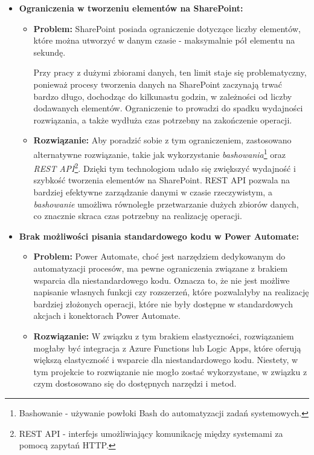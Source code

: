 \begin{itemize}
    \item \textbf{Ograniczenia w tworzeniu elementów na SharePoint:}
          \begin{itemize}
              \item \textbf{Problem:} SharePoint posiada ograniczenie dotyczące liczby elementów, które można utworzyć w danym czasie - maksymalnie pół elementu na sekundę.


                    Przy pracy z dużymi zbiorami danych, ten limit staje się problematyczny, ponieważ procesy tworzenia danych na SharePoint zaczynają trwać bardzo długo, dochodząc do kilkunastu godzin, w zależności od liczby dodawanych elementów. Ograniczenie to prowadzi do spadku wydajności rozwiązania, a także wydłuża czas potrzebny na zakończenie operacji.

              \item \textbf{Rozwiązanie:} Aby poradzić sobie z tym ograniczeniem, zastosowano alternatywne rozwiązanie, takie jak wykorzystanie \emph{bashowania}\footnote{Bashowanie - używanie powłoki Bash do automatyzacji zadań systemowych.} oraz \emph{REST API}\footnote{REST API - interfejs umożliwiający komunikację między systemami za pomocą zapytań HTTP.}. Dzięki tym technologiom udało się zwiększyć wydajność i szybkość tworzenia elementów na SharePoint. REST API pozwala na bardziej efektywne zarządzanie danymi w czasie rzeczywistym, a \emph{bashowanie} umożliwa równoległe przetwarzanie dużych zbiorów danych, co znacznie skraca czas potrzebny na realizację operacji.

          \end{itemize}

    \item \textbf{Brak możliwości pisania standardowego kodu w Power Automate:}
          \begin{itemize}
              \item \textbf{Problem:} Power Automate, choć jest narzędziem dedykowanym do automatyzacji procesów, ma pewne ograniczenia związane z brakiem wsparcia dla niestandardowego kodu. Oznacza to, że nie jest możliwe napisanie własnych funkcji czy rozszerzeń, które pozwalałyby na realizację bardziej złożonych operacji, które nie były dostępne w standardowych akcjach i konektorach Power Automate.
              \item \textbf{Rozwiązanie:} W związku z tym brakiem elastyczności, rozwiązaniem mogłaby być integracja z Azure Functions lub Logic Apps, które oferują większą elastyczność i wsparcie dla niestandardowego kodu. Niestety, w tym projekcie to rozwiązanie nie mogło zostać wykorzystane, w związku z czym dostosowano się do dostępnych narzędzi i metod.
          \end{itemize}


\end{itemize}
